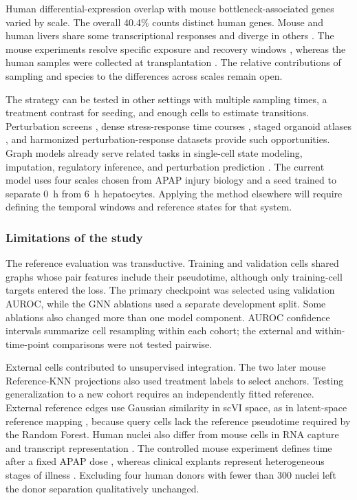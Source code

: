 Human differential-expression overlap with mouse bottleneck-associated genes varied by scale. The overall 40.4\% counts distinct human genes. Mouse and human livers share some transcriptional responses and diverge in others \cite{ref082,ref083,ref084}. The mouse experiments resolve specific exposure and recovery windows \cite{ref085,ref086}, whereas the human samples were collected at transplantation \cite{ref019}. The relative contributions of sampling and species to the differences across scales remain open.

The strategy can be tested in other settings with multiple sampling times, a treatment contrast for seeding, and enough cells to estimate transitions. Perturbation screens \cite{ref087}, dense stress-response time courses \cite{ref088}, staged organoid atlases \cite{ref089}, and harmonized perturbation-response datasets \cite{ref090} provide such opportunities. Graph models already serve related tasks in single-cell state modeling, imputation, regulatory inference, and perturbation prediction \cite{ref024,ref091,ref092,ref093,ref094,ref095,ref096,ref097}. The current model uses four scales chosen from APAP injury biology \cite{ref006,ref010,ref034} and a seed trained to separate 0~h from 6~h hepatocytes. Applying the method elsewhere will require defining the temporal windows and reference states for that system.

\subsubsection*{Limitations of the study}

The reference evaluation was transductive. Training and validation cells shared graphs whose pair features include their pseudotime, although only training-cell targets entered the loss. The primary checkpoint was selected using validation AUROC, while the GNN ablations used a separate development split. Some ablations also changed more than one model component. AUROC confidence intervals summarize cell resampling within each cohort; the external and within-time-point comparisons were not tested pairwise.

External cells contributed to unsupervised integration. The two later mouse Reference-KNN projections also used treatment labels to select anchors. Testing generalization to a new cohort requires an independently fitted reference. External reference edges use Gaussian similarity in scVI space, as in latent-space reference mapping \cite{ref064,ref098,ref099}, because query cells lack the reference pseudotime required by the Random Forest. Human nuclei also differ from mouse cells in RNA capture and transcript representation \cite{ref100}. The controlled mouse experiment defines time after a fixed APAP dose \cite{ref101,ref102}, whereas clinical explants represent heterogeneous stages of illness \cite{ref019}. Excluding four human donors with fewer than 300 nuclei left the donor separation qualitatively unchanged.

